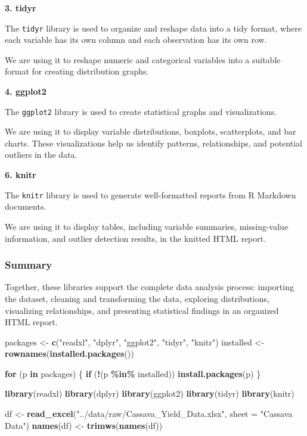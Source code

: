 \documentclass[
]{article}
\newenvironment{Shaded}{\begin{snugshade}}{\end{snugshade}}
\newcommand{\AttributeTok}[1]{\textcolor[rgb]{0.13,0.29,0.53}{#1}}
\newcommand{\ControlFlowTok}[1]{\textcolor[rgb]{0.13,0.29,0.53}{\textbf{#1}}}
\newcommand{\FunctionTok}[1]{\textcolor[rgb]{0.13,0.29,0.53}{\textbf{#1}}}
\newcommand{\NormalTok}[1]{#1}
\newcommand{\OtherTok}[1]{\textcolor[rgb]{0.56,0.35,0.01}{#1}}
\newcommand{\SpecialCharTok}[1]{\textcolor[rgb]{0.81,0.36,0.00}{\textbf{#1}}}
\newcommand{\StringTok}[1]{\textcolor[rgb]{0.31,0.60,0.02}{#1}}
\begin{document}
\textbf{3. tidyr}

The \texttt{tidyr} library is used to organize and reshape data into a
tidy format, where each variable has its own column and each observation
has its own row.

We are using it to reshape numeric and categorical variables into a
suitable format for creating distribution graphs.

\textbf{4. ggplot2}

The \texttt{ggplot2} library is used to create statistical graphs and
visualizations.

We are using it to display variable distributions, boxplots,
scatterplots, and bar charts. These visualizations help us identify
patterns, relationships, and potential outliers in the data.

\textbf{6. knitr}

The \texttt{knitr} library is used to generate well-formatted reports
from R Markdown documents.

We are using it to display tables, including variable summaries,
missing-value information, and outlier detection results, in the knitted
HTML report.

\subsubsection{Summary}\label{summary}

Together, these libraries support the complete data analysis process:
importing the dataset, cleaning and transforming the data, exploring
distributions, visualizing relationships, and presenting statistical
findings in an organized HTML report.

\begin{Shaded}
\begin{Highlighting}[]
\NormalTok{packages }\OtherTok{\textless{}{-}} \FunctionTok{c}\NormalTok{(}\StringTok{"readxl"}\NormalTok{, }\StringTok{"dplyr"}\NormalTok{, }\StringTok{"ggplot2"}\NormalTok{, }\StringTok{"tidyr"}\NormalTok{, }\StringTok{"knitr"}\NormalTok{)}
\NormalTok{installed }\OtherTok{\textless{}{-}} \FunctionTok{rownames}\NormalTok{(}\FunctionTok{installed.packages}\NormalTok{())}

\ControlFlowTok{for}\NormalTok{ (p }\ControlFlowTok{in}\NormalTok{ packages) \{}
  \ControlFlowTok{if}\NormalTok{ (}\SpecialCharTok{!}\NormalTok{(p }\SpecialCharTok{\%in\%}\NormalTok{ installed)) }\FunctionTok{install.packages}\NormalTok{(p)}
\NormalTok{\}}

\FunctionTok{library}\NormalTok{(readxl)}
\FunctionTok{library}\NormalTok{(dplyr)}
\FunctionTok{library}\NormalTok{(ggplot2)}
\FunctionTok{library}\NormalTok{(tidyr)}
\FunctionTok{library}\NormalTok{(knitr)}

\NormalTok{df }\OtherTok{\textless{}{-}} \FunctionTok{read\_excel}\NormalTok{(}\StringTok{"../data/raw/Cassava\_Yield\_Data.xlsx"}\NormalTok{,}
                 \AttributeTok{sheet =} \StringTok{"Cassava Data"}\NormalTok{)}
\FunctionTok{names}\NormalTok{(df) }\OtherTok{\textless{}{-}} \FunctionTok{trimws}\NormalTok{(}\FunctionTok{names}\NormalTok{(df))}
\end{Highlighting}
\end{Shaded}
\end{document}
